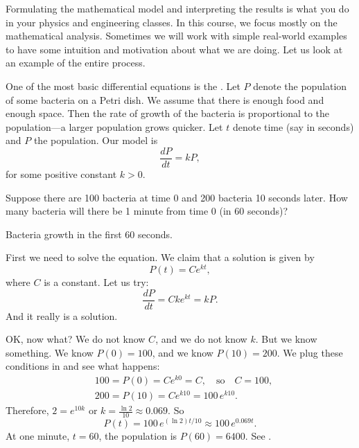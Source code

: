 Formulating the mathematical model and interpreting
the results is what you do in your physics and engineering classes.
In this
course, we focus mostly on the mathematical analysis.
Sometimes we will
work with simple real-world examples
to have some intuition and
motivation about what we are doing.
Let us look at 
an example of the entire process.

\begin{example}
One of the most basic differential equations
is the \emph{}.
Let $P$ denote the population 
of some bacteria on a Petri dish.  We assume that there is enough food
and enough space.  Then the rate of growth of the bacteria is proportional
to the population---a larger population grows quicker.  Let $t$ denote
time (say in seconds) and $P$ the population.  Our model
is
\begin{equation*}
\frac{dP}{dt} = kP ,
\end{equation*}
for some positive constant $k > 0$.

Suppose there are 100 bacteria at time 0 and 200 bacteria 10 seconds later.
How many bacteria will there be 1 minute from time 0 (in 60 seconds)?

\begin{mywrapfig}{3.25in}
\capstart
{}
\caption{Bacteria growth in the first 60 seconds.\label{intro:plotbactfig}}
\end{mywrapfig}
%
%
First we need to solve the equation.  We claim that a solution is given by
\begin{equation*}
P(t) = C e^{kt} ,
\end{equation*}
where $C$ is a constant.  Let us try:
\begin{equation*}
\frac{dP}{dt} = C k e^{kt} = k P .
\end{equation*}
And it really is a solution.

OK\@, now what?  We do not know $C$, and we do not know $k$.  But we know
something.  We know $P(0) = 100$, and we know 
$P(10) = 200$.  We plug these conditions in and see what happens:
\begin{align*}
& 100 = P(0) = C e^{k0} = C, \quad \text{so} \quad C=100,\\
& 200 = P(10) = C e^{k10} = 100 \, e^{k10} .
\end{align*}
Therefore, $2 = e^{10k}$ or $k = \frac{\ln 2}{10} \approx 0.069$.
So 
\begin{equation*}
P(t) = 100 \, e^{(\ln 2) t / 10} \approx 100 \, e^{0.069 t} .
\end{equation*}
At one minute, $t=60$, the population is $P(60) = 6400$.  See
.



\end{example}
